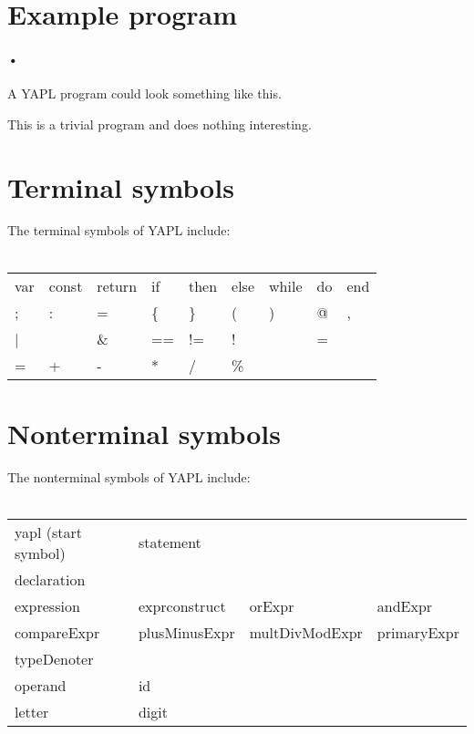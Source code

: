 \setlength{\grammarparsep}{10pt plus 1pt minus 1pt} %
\setlength{\grammarindent}{12em} %
\section{Example program}

\paragraph{•}
A YAPL program could look something like this.


This is a trivial program and does nothing interesting. 
\section{Terminal symbols}
The terminal symbols of YAPL include:\\\\
\begin{tabular}{lllllllll}
var	&	const	&	return	&	if	&	then	&	else	&	while	&	do	&	end \\
;	&	: 		& 	= 		& 	\{ 	& 	\} 		& 	( 		& 	) 		& 	@ 	& 	, 	\\ 
| 	& 	\		&	\& 		& 	== 	& 	!= 		& 	! 		& 	 		& 	=	& 	 	\\
=	&	+ 		& 	- 		& 	* 	& 	/ 		& 	\% 	\\
\end{tabular}

\section{Nonterminal symbols}
The nonterminal symbols of YAPL include:\\\\
\begin{tabular}{llll}
yapl	 (start symbol)		&	statement		&					&		\\
declaration					&					&					&		\\
expression					&	exprconstruct	&	orExpr			&	andExpr	\\
compareExpr					&	plusMinusExpr	&	multDivModExpr	&	primaryExpr	\\
typeDenoter					&					&					&		\\
operand						&	id				&					&		\\
letter						&	digit			&					&		\\
\end{tabular}

